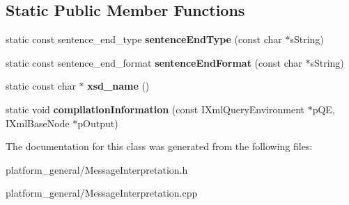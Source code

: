 \subsection*{\-Static \-Public \-Member \-Functions}
\begin{DoxyCompactItemize}
\item 
\hypertarget{classgeneral__server_1_1MessageInterpretation_acfde7766b395fd24a35c8b4832b80d13}{static const sentence\-\_\-end\-\_\-type {\bfseries sentence\-End\-Type} (const char $\ast$s\-String)}\label{classgeneral__server_1_1MessageInterpretation_acfde7766b395fd24a35c8b4832b80d13}

\item 
\hypertarget{classgeneral__server_1_1MessageInterpretation_a85529e8f007bdc34a074bf12a5b106a9}{static const sentence\-\_\-end\-\_\-format {\bfseries sentence\-End\-Format} (const char $\ast$s\-String)}\label{classgeneral__server_1_1MessageInterpretation_a85529e8f007bdc34a074bf12a5b106a9}

\item 
\hypertarget{classgeneral__server_1_1MessageInterpretation_a8b3d26ed73f353ba891b0944a3e4b896}{static const char $\ast$ {\bfseries xsd\-\_\-name} ()}\label{classgeneral__server_1_1MessageInterpretation_a8b3d26ed73f353ba891b0944a3e4b896}

\item 
\hypertarget{classgeneral__server_1_1MessageInterpretation_af1eb91dad177753f1e9c7e8c89fb14b1}{static void {\bfseries compilation\-Information} (const \-I\-Xml\-Query\-Environment $\ast$p\-Q\-E, \-I\-Xml\-Base\-Node $\ast$p\-Output)}\label{classgeneral__server_1_1MessageInterpretation_af1eb91dad177753f1e9c7e8c89fb14b1}

\end{DoxyCompactItemize}


\-The documentation for this class was generated from the following files\-:\begin{DoxyCompactItemize}
\item 
platform\-\_\-general/\-Message\-Interpretation.\-h\item 
platform\-\_\-general/\-Message\-Interpretation.\-cpp\end{DoxyCompactItemize}
